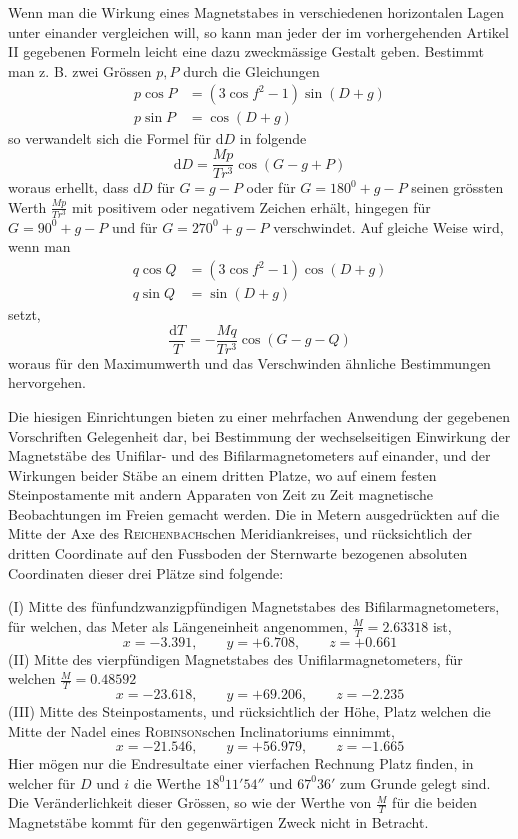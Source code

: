 Wenn man die Wirkung eines Magnetstabes in verschiedenen horizontalen Lagen unter einander vergleichen will, so kann man jeder der im vorhergehenden Artikel II gegebenen Formeln leicht eine dazu zweckmässige Gestalt geben. Bestimmt man z. B. zwei Grössen $p,P$ durch die Gleichungen
\[
\begin{aligned}
p\cos P&=(3\cos f^2-1)\sin(D+g)\\
p\sin P&=\cos(D+g)
\end{aligned}
\]
so verwandelt sich die Formel für $\mathrm{d}D$ in folgende
\[
\mathrm{d}D=\frac{Mp}{Tr^3}\cos(G-g+P)
\]
woraus erhellt, dass $\mathrm{d}D$ für $G=g-P$ oder für $G=180^0+g-P$ seinen grössten Werth $\frac{Mp}{Tr^3}$ mit positivem oder negativem Zeichen erhält, hingegen für $G=90^0+g-P$ und für $G=270^0+g-P$ verschwindet. Auf gleiche Weise wird, wenn man
\[
\begin{aligned}
q\cos Q&=(3\cos f^2-1)\cos(D+g)\\
q\sin Q&=\sin(D+g)
\end{aligned}
\]
setzt,
\[
\frac{\mathrm{d}T}{T}=-\frac{Mq}{Tr^3}\cos(G-g-Q)
\]
woraus für den Maximumwerth und das Verschwinden ähnliche Bestimmungen hervorgehen.

Die hiesigen Einrichtungen bieten zu einer mehrfachen Anwendung der gegebenen Vorschriften Gelegenheit dar, bei Bestimmung der wechselseitigen Einwirkung der Magnetstäbe des Unifilar- und des Bifilarmagnetometers auf einander, und der Wirkungen beider Stäbe an einem dritten Platze, wo auf einem festen Steinpostamente mit andern Apparaten von Zeit zu Zeit magnetische Beobachtungen im Freien gemacht werden. Die in Metern ausgedrückten auf die Mitte
der Axe des \textsc{Reichenbach}schen Meridiankreises, und rücksichtlich der dritten Coordinate auf den Fussboden der Sternwarte bezogenen absoluten Coordinaten dieser drei Plätze sind folgende:

(I) Mitte des fünfundzwanzigpfündigen Magnetstabes des Bifilarmagnetometers, für welchen, das Meter als Längeneinheit angenommen, $\frac{M}{T}=2.63318$ ist,
\[
x=-3.391,\qquad y=+6.708,\qquad z=+0.661
\]
(II) Mitte des vierpfündigen Magnetstabes des Unifilarmagnetometers, für welchen $\frac{M}{T}=0.48592$
\[
x=-23.618,\qquad y=+69.206,\qquad z=-2.235
\]
(III) Mitte des Steinpostaments, und rücksichtlich der Höhe, Platz welchen die Mitte der Nadel eines \textsc{Robinson}schen Inclinatoriums einnimmt,
\[
x=-21.546,\qquad y=+56.979,\qquad z=-1.665
\]
Hier mögen nur die Endresultate einer vierfachen Rechnung Platz finden, in welcher für $D$ und $i$ die Werthe $18^0 11'54''$ und $67^0 36'$ zum Grunde gelegt sind. Die Veränderlichkeit dieser Grössen, so wie der Werthe von $\frac{M}{T}$ für die beiden Magnetstäbe kommt für den gegenwärtigen Zweck nicht in Betracht.

